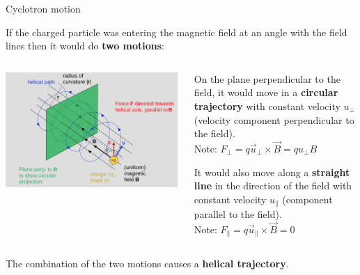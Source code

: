 \begin{frame}{Cyclotron motion}

If the charged particle was entering the magnetic field at an angle with the field lines then it would do {\bf two motions}:\\
\vspace{0.2cm}

\begin{columns}
  \begin{column}{0.50\textwidth}
    \begin{center}
      \includegraphics[width=0.99\textwidth]{./images/schematics/cyclotron_motion_02.png}\\
    \end{center}
  \end{column}
  \begin{column}{0.50\textwidth}
      \begin{itemize}
      {\small
         \item On the plane perpendicular to the field, it would move in a {\bf circular trajectory}
                   with constant velocity $u_{\perp}$ (velocity component perpendicular to the field).\\
                   Note: $F_{\perp} = q \vec{u}_{\perp} \times \vec{B} = q {u}_{\perp} B$
         \item It would also move along a {\bf straight line} in the direction of the field with constant
                   velocity $u_{\parallel}$  (component parallel to the field).\\
                   Note: $F_{\parallel} = q \vec{u}_{\parallel} \times \vec{B} = 0$
      }
      \end{itemize}
  \end{column}
\end{columns}

\vspace{0.2cm}
The combination of the two motions causes a {\bf helical trajectory}.\\

\end{frame}

